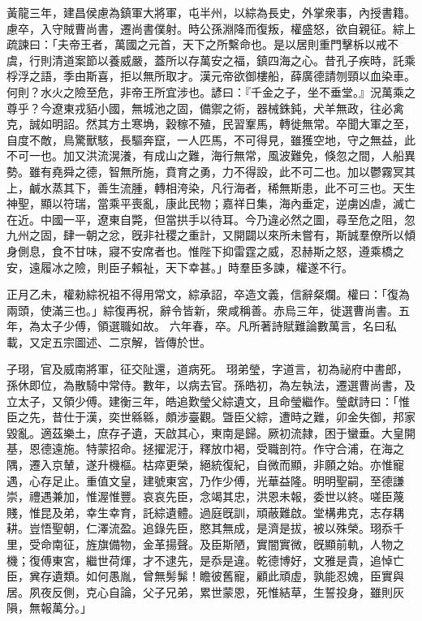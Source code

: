 \begin{pinyinscope}
 
 黃龍三年，建昌侯慮為鎮軍大將軍，屯半州，以綜為長史，外掌衆事，內授書籍。慮卒，入守賊曹尚書，遷尚書僕射。時公孫淵降而復叛，權盛怒，欲自親征。綜上疏諫曰：「夫帝王者，萬國之元首，天下之所繫命也。是以居則重門擊柝以戒不虞，行則清道案節以養威嚴，蓋所以存萬安之福，鎮四海之心。昔孔子疾時，託乘桴浮之語，季由斯喜，拒以無所取才。漢元帝欲御樓船，薛廣德請刎頸以血染車。何則？水火之險至危，非帝王所宜涉也。諺曰：『千金之子，坐不垂堂。』況萬乘之尊乎？今遼東戎貊小國，無城池之固，備禦之術，器械銖鈍，犬羊無政，往必禽克，誠如明詔。然其方土寒埆，穀稼不殖，民習鞌馬，轉徙無常。卒聞大軍之至，自度不敵，鳥驚獸駭，長驅奔竄，一人匹馬，不可得見，雖獲空地，守之無益，此不可一也。加又洪流滉瀁，有成山之難，海行無常，風波難免，倏忽之間，人船異勢。雖有堯舜之德，智無所施，賁育之勇，力不得設，此不可二也。加以鬱霧冥其上，鹹水蒸其下，善生流腫，轉相洿染，凡行海者，稀無斯患，此不可三也。天生神聖，顯以符瑞，當乘平喪亂，康此民物；嘉祥日集，海內垂定，逆虜凶虐，滅亡在近。中國一平，遼東自斃，但當拱手以待耳。今乃違必然之圖，尋至危之阻，忽九州之固，肆一朝之忿，旣非社稷之重計，又開闢以來所未嘗有，斯誠羣僚所以傾身側息，食不甘味，寢不安席者也。惟陛下抑雷霆之威，忍赫斯之怒，遵乘橋之安，遠履冰之險，則臣子賴祉，天下幸甚。」時羣臣多諫，權遂不行。
 
 
正月乙未，權勑綜祝祖不得用常文，綜承詔，卒造文義，信辭粲爛。權曰：「復為兩頭，使滿三也。」綜復再祝，辭令皆新，衆咸稱善。赤烏三年，徙選曹尚書。五年，為太子少傅，領選職如故。
 六年春，卒。凡所著詩賦難論數萬言，名曰私載，又定五宗圖述、二京解，皆傳於世。
 
 
子珝，官及威南將軍，征交阯還，道病死。
 珝弟瑩，字道言，初為祕府中書郎，孫休即位，為散騎中常侍。數年，以病去官。孫皓初，為左執法，遷選曹尚書，及立太子，又領少傅。建衡三年，皓追歎瑩父綜遺文，且命瑩繼作。瑩獻詩曰：「惟臣之先，昔仕于漢，奕世緜緜，頗涉臺觀。曁臣父綜，遭時之難，卯金失御，邦家毀亂。適茲樂土，庶存孑遺，天啟其心，東南是歸。厥初流隷，困于蠻垂。大皇開基，恩德遠施。特蒙招命。拯擢泥汙，釋放巾褐，受職剖符。作守合浦，在海之隅，遷入京輦，遂升機樞。枯瘁更榮，絕統復紀，自微而顯，非願之始。亦惟寵遇，心存足止。重值文皇，建號東宮，乃作少傅，光華益隆。明明聖嗣，至德謙崇，禮遇兼加，惟渥惟豐。哀哀先臣，念竭其忠，洪恩未報，委世以終。嗟臣蔑賤，惟昆及弟，幸生幸育，託綜遺體。過庭旣訓，頑蔽難啟。堂構弗克，志存耦耕。豈悟聖朝，仁澤流盈。追錄先臣，愍其無成，是濟是拔，被以殊榮。珝忝千里，受命南征，旌旗備物，金革揚聲。及臣斯陋，實闇實微，旣顯前軌，人物之機；復傅東宮，繼世荷煇，才不逮先，是忝是違。乾德博好，文雅是貴，追悼亡臣，兾存遺類。如何愚胤，曾無髣髴！瞻彼舊寵，顧此頑虛，孰能忍媿，臣實與居。夙夜反側，克心自論，父子兄弟，累世蒙恩，死惟結草，生誓投身，雖則灰隕，無報萬分。」
 

\end{pinyinscope}
